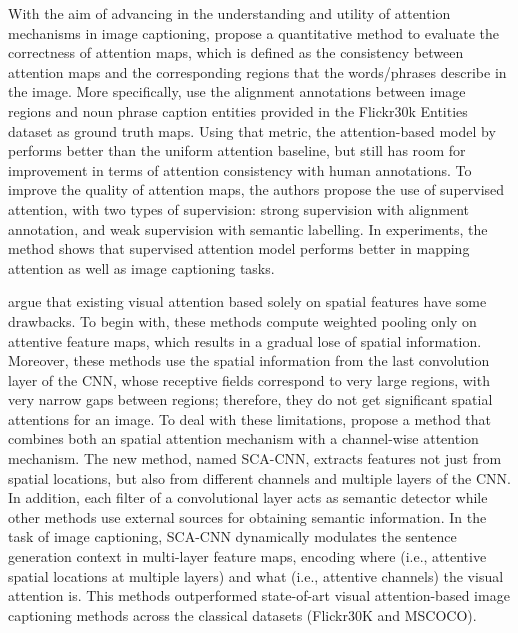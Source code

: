 With the aim of advancing in the understanding and utility of attention mechanisms in image captioning, \citet{Liu2017a} propose a quantitative method to evaluate the correctness of attention maps, which is defined as the consistency between attention maps and the corresponding regions that the words/phrases describe in the image. More specifically, \citeauthor{Liu2017a} use the alignment annotations between image regions and noun phrase caption entities provided in the Flickr30k Entities dataset \citep{Plummer2015} as  ground truth maps. Using that metric, the attention-based model by \citet{Xu2015} performs better than the uniform attention baseline, but still has room for improvement in terms of attention consistency with human annotations. To improve the quality of attention maps, the authors propose the use of supervised attention, with two types of supervision: strong supervision with alignment annotation, and weak supervision with semantic labelling. In experiments, the method shows that supervised attention model performs better in mapping attention as well as image captioning tasks.

\citet{Chen2017} argue that existing visual attention based solely on spatial features have some drawbacks. To begin with, these methods compute weighted pooling only on attentive feature maps, which results in a gradual lose of spatial information. Moreover, these methods use the spatial information from the last convolution layer of the CNN, whose receptive fields correspond to very large regions, with very narrow gaps between regions; therefore, they do not get significant spatial attentions for an image. To deal with these limitations, \citeauthor{Chen2017} propose a method that combines both an spatial attention mechanism with a channel-wise attention mechanism. The new method, named SCA-CNN, extracts features not just from spatial locations, but also from different channels and multiple layers of the CNN. In addition, each filter of a convolutional layer acts as semantic detector \citep{Zeiler2014} while other methods use external sources for obtaining semantic information. In the task of image captioning, SCA-CNN dynamically modulates the sentence generation context in multi-layer feature maps, encoding where (i.e., attentive spatial locations at multiple layers) and what (i.e., attentive channels) the visual attention is.  This methods outperformed state-of-art visual attention-based image captioning methods across the classical datasets (Flickr30K and MSCOCO).

